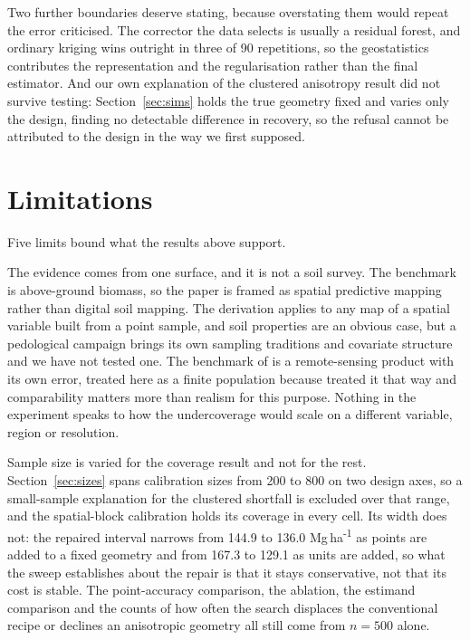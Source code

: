 \documentclass[preprint,12pt,authoryear]{elsarticle}
\newcommand{\Mgha}{Mg\,ha\textsuperscript{-1}}
\begin{document}
Two further boundaries deserve stating, because overstating them would repeat
the error \citet{wadoux2021} criticised. The corrector the data selects is
usually a residual forest, and ordinary kriging wins outright in three of 90
repetitions, so the geostatistics contributes the representation and the
regularisation rather than the final estimator. And our own explanation of the
clustered anisotropy result did not survive testing: Section~\ref{sec:sims}
holds the true geometry fixed and varies only the design, finding no detectable
difference in recovery, so the refusal cannot be attributed to the design in the
way we first supposed.

\section{Limitations}
\label{sec:limits}

Five limits bound what the results above support.

The evidence comes from one surface, and it is not a soil survey. The
benchmark is above-ground biomass, so the paper is framed as spatial
predictive mapping rather than digital soil mapping. The derivation applies to
any map of a spatial variable built from a point sample, and soil properties
are an obvious case, but a pedological campaign brings its own sampling
traditions and covariate structure and we have not tested one. The benchmark of \citet{baccini2012} is a
remote-sensing product with its own error, treated here as a finite population
because \citet{wadoux2021} treated it that way and comparability matters more
than realism for this purpose. Nothing in the experiment speaks to how the
undercoverage would scale on a different variable, region or resolution.

Sample size is varied for the coverage result and not for the rest.
Section~\ref{sec:sizes} spans calibration sizes from 200 to 800 on two design
axes, so a small-sample explanation for the clustered shortfall is excluded over
that range, and the spatial-block calibration holds its coverage in every cell.
Its width does not: the repaired interval narrows from 144.9 to 136.0 \Mgha{}
as points are added to a fixed geometry and from 167.3 to 129.1 as units are
added, so what the sweep establishes about the repair is that it stays
conservative, not that its cost is stable. The point-accuracy comparison, the
ablation, the estimand comparison and the counts of how often the search
displaces the conventional recipe or declines an anisotropic geometry all still
come from $n = 500$ alone.
\end{document}
